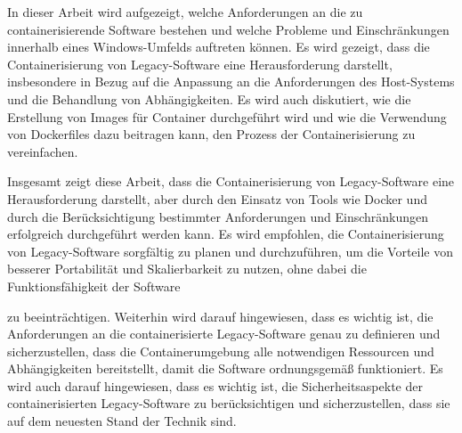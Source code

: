 In dieser Arbeit wird aufgezeigt, welche Anforderungen an die zu containerisierende Software bestehen und welche Probleme und Einschränkungen innerhalb eines Windows-Umfelds auftreten können. Es wird gezeigt, dass die Containerisierung von Legacy-Software eine Herausforderung darstellt, insbesondere in Bezug auf die Anpassung an die Anforderungen des Host-Systems und die Behandlung von Abhängigkeiten. Es wird auch diskutiert, wie die Erstellung von Images für Container durchgeführt wird und wie die Verwendung von Dockerfiles dazu beitragen kann, den Prozess der Containerisierung zu vereinfachen.

Insgesamt zeigt diese Arbeit, dass die Containerisierung von Legacy-Software eine Herausforderung darstellt, aber durch den Einsatz von Tools wie Docker und durch die Berücksichtigung bestimmter Anforderungen und Einschränkungen erfolgreich durchgeführt werden kann. Es wird empfohlen, die Containerisierung von Legacy-Software sorgfältig zu planen und durchzuführen, um die Vorteile von besserer Portabilität und Skalierbarkeit zu nutzen, ohne dabei die Funktionsfähigkeit der Software

zu beeinträchtigen. Weiterhin wird darauf hingewiesen, dass es wichtig ist, die Anforderungen an die containerisierte Legacy-Software genau zu definieren und sicherzustellen, dass die Containerumgebung alle notwendigen Ressourcen und Abhängigkeiten bereitstellt, damit die Software ordnungsgemäß funktioniert. Es wird auch darauf hingewiesen, dass es wichtig ist, die Sicherheitsaspekte der containerisierten Legacy-Software zu berücksichtigen und sicherzustellen, dass sie auf dem neuesten Stand der Technik sind.


